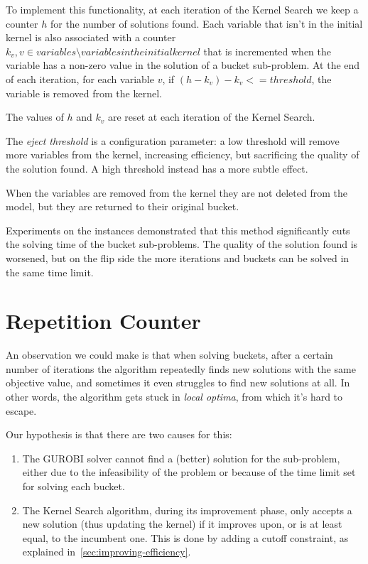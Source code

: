 To implement this functionality, at each iteration of the Kernel Search
we keep a counter \(h\) for the number of solutions found.
Each variable that isn't in the initial kernel
is also associated with a counter \(k_{v}, v \in variables \setminus variables in the initial kernel\)
that is incremented when the variable has a non-zero value in the solution of a bucket sub-problem.
At the end of each iteration, for each variable \(v\), if
\((h - k_{v}) - k_{v} <= threshold\), the variable is removed from the kernel.

The values of \(h\) and \(k_{v}\) are reset at each iteration of the Kernel Search.

The \textit{eject threshold} is a configuration parameter:
a low threshold will remove more variables from the kernel, increasing efficiency,
but sacrificing the quality of the solution found.
A high threshold instead has a more subtle effect.

When the variables are removed from the kernel they are not deleted from the model,
but they are returned to their original bucket.

Experiments on the instances demonstrated that this method significantly cuts
the solving time of the bucket sub-problems.
The quality of the solution found is worsened, but on the flip side
the more iterations and buckets can be solved in the same time limit.


\section{Repetition Counter}
An observation we could make is that when solving buckets,
after a certain number of iterations the algorithm
repeatedly finds new solutions with the same objective value,
and sometimes it even struggles to find new solutions at all.
In other words, the algorithm gets stuck in \textit{local optima},
from which it's hard to escape.

Our hypothesis is that there are two causes for this:
\begin{enumerate}
    \item The GUROBI solver cannot find a (better) solution for the sub-problem,
    either due to the infeasibility of the problem or because of
    the time limit set for solving each bucket.
    \item The Kernel Search algorithm, during its improvement phase,
    only accepts a new solution (thus updating the kernel)
    if it improves upon, or is at least equal, to the incumbent one.
    This is done by adding a cutoff constraint, as explained in~\ref{sec:improving-efficiency}.
\end{enumerate}

